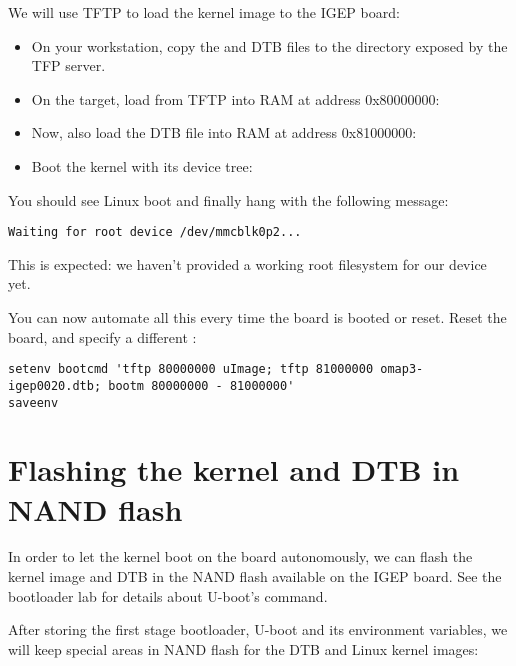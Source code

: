 We will use TFTP to load the kernel image to the IGEP board:

\begin{itemize}

\item On your workstation, copy the  and DTB files to the
  directory exposed by the TFP server.

\item On the target, load  from TFTP into RAM at address
  0x80000000:\\

\item Now, also load the DTB file into RAM at address 0x81000000:\\

\item Boot the kernel with its device tree:\\

\end{itemize}

You should see Linux boot and finally hang with the following message:

\begin{verbatim}
Waiting for root device /dev/mmcblk0p2...
\end{verbatim}

This is expected: we haven't provided a working root filesystem for
our device yet.

You can now automate all this every time the board is booted or
reset. Reset the board, and specify a different :

{\scriptsize
\begin{verbatim}
setenv bootcmd 'tftp 80000000 uImage; tftp 81000000 omap3-igep0020.dtb; bootm 80000000 - 81000000'
saveenv
\end{verbatim}
}

\section{Flashing the kernel and DTB in NAND flash}

In order to let the kernel boot on the board autonomously, we can
flash the kernel image and DTB in the NAND flash available on the IGEP
board. See the bootloader lab for details about U-boot's 
command.

After storing the first stage bootloader, U-boot and its environment
variables, we will keep special areas in NAND flash for the DTB
and Linux kernel images:

